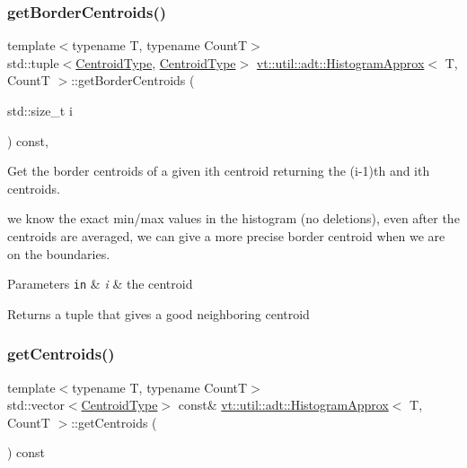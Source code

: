 \subsubsection{\texorpdfstring{get\+Border\+Centroids()}{getBorderCentroids()}}
{\footnotesize\ttfamily template$<$typename T, typename CountT$>$ \\
std\+::tuple$<$\hyperlink{structvt_1_1util_1_1adt_1_1_histogram_approx_aabacbad5be3a407cb00938f079177b95}{Centroid\+Type}, \hyperlink{structvt_1_1util_1_1adt_1_1_histogram_approx_aabacbad5be3a407cb00938f079177b95}{Centroid\+Type}$>$ \hyperlink{structvt_1_1util_1_1adt_1_1_histogram_approx}{vt\+::util\+::adt\+::\+Histogram\+Approx}$<$ T, CountT $>$\+::get\+Border\+Centroids (\begin{DoxyParamCaption}\item[{std\+::size\+\_\+t}]{i }\end{DoxyParamCaption}) const\hspace{0.3cm}{\ttfamily [inline]}, {\ttfamily [private]}}



Get the border centroids of a given i\textquotesingle{}th centroid returning the (i-\/1)\textquotesingle{}th and i\textquotesingle{}th centroids. 

we know the exact min/max values in the histogram (no deletions), even after the centroids are averaged, we can give a more precise border centroid when we are on the boundaries.


\begin{DoxyParams}[1]{Parameters}
\mbox{\tt in}  & {\em i} & the centroid\\
\hline
\end{DoxyParams}
\begin{DoxyReturn}{Returns}
a tuple that gives a good neighboring centroid 
\end{DoxyReturn}
\mbox{\label{structvt_1_1util_1_1adt_1_1_histogram_approx_ac23b01ef594bcdd86859becf7d81c3b2}} 
\subsubsection{\texorpdfstring{get\+Centroids()}{getCentroids()}}
{\footnotesize\ttfamily template$<$typename T, typename CountT$>$ \\
std\+::vector$<$\hyperlink{structvt_1_1util_1_1adt_1_1_histogram_approx_aabacbad5be3a407cb00938f079177b95}{Centroid\+Type}$>$ const\& \hyperlink{structvt_1_1util_1_1adt_1_1_histogram_approx}{vt\+::util\+::adt\+::\+Histogram\+Approx}$<$ T, CountT $>$\+::get\+Centroids (\begin{DoxyParamCaption}{ }\end{DoxyParamCaption}) const\hspace{0.3cm}{\ttfamily [inline]}}



